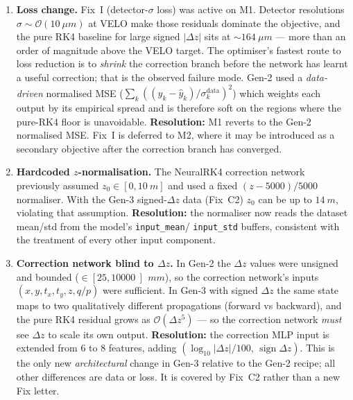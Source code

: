 \documentclass[a4paper,11pt]{article}
\newcommand{\SI}[2]{#1~#2}
\newcommand{\num}[1]{#1}
\newcommand{\dz}{\Delta z}
\begin{document}
\begin{enumerate}
  \item \textbf{Loss change.}  Fix~I (detector-$\sigma$ loss) was
        active on M1.  Detector resolutions
        $\sigma \sim \mathcal{O}(\SI{10}{\mu m})$ at VELO make those
        residuals dominate the objective, and the pure RK4 baseline
        for large signed $|\dz|$ sits at $\sim\SI{164}{\mu m}$
        --- more than an order of magnitude above the VELO target.
        The optimiser's fastest route to loss reduction is to
        \emph{shrink} the correction branch before the network has
        learnt a useful correction; that is the observed failure
        mode.  Gen-2 used a \emph{data-driven} normalised MSE
        ($\sum_k ((y_k-\hat y_k)/\sigma^{\mathrm{data}}_k)^2$)
        which weights each output by its empirical spread and is
        therefore soft on the regions where the pure-RK4 floor is
        unavoidable.  \textbf{Resolution:} M1 reverts to the Gen-2
        normalised MSE.  Fix~I is deferred to M2, where it may be
        introduced as a secondary objective after the correction
        branch has converged.
  \item \textbf{Hardcoded $z$-normalisation.}  The NeuralRK4
        correction network previously assumed $z_0\in[0,\SI{10}{m}]$
        and used a fixed $(z-\num{5000})/\num{5000}$ normaliser.
        With the Gen-3 signed-$\dz$ data (Fix~C2) $z_0$ can be up
        to $\SI{14}{m}$, violating that assumption.
        \textbf{Resolution:} the normaliser now reads the dataset
        mean/std from the model's \texttt{input\_mean}/
        \texttt{input\_std} buffers, consistent with the treatment
        of every other input component.
  \item \textbf{Correction network blind to $\dz$.}  In Gen-2 the
        $\dz$ values were unsigned and bounded ($\in[25,
        \SI{10000}]\,\SI{}{mm}$), so the correction network's
        inputs $(x,y,t_x,t_y,z,q/p)$ were sufficient.  In Gen-3
        with signed $\dz$ the same state maps to two qualitatively
        different propagations (forward vs backward), and the pure
        RK4 residual grows as $\mathcal{O}(\dz^5)$ --- so the
        correction network \emph{must} see $\dz$ to scale its own
        output.  \textbf{Resolution:} the correction MLP input is
        extended from 6 to 8 features, adding
        $(\log_{10}|\dz|/100,\,\operatorname{sign}\dz)$.  This is
        the only new \emph{architectural} change in Gen-3 relative
        to the Gen-2 recipe; all other differences are data or
        loss.  It is covered by Fix~C2 rather than a new Fix letter.
\end{enumerate}
\end{document}
